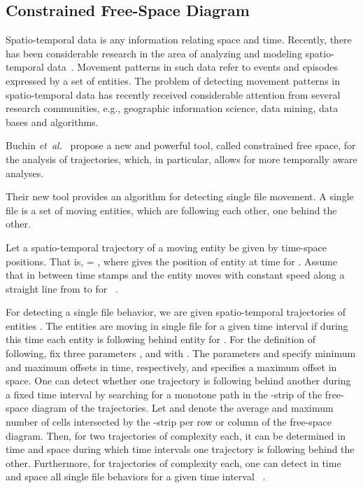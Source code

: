 \documentclass[12pt]{dalthesis}
\newcommand{\etal}{{\em et~al.\/}}
\begin{document}
\subsection{Constrained Free-Space Diagram}


Spatio-temporal data is any information relating space and time. 
Recently, there has been considerable research 
in the area of analyzing and modeling spatio-temporal data~\cite{Cons-Free}. 
Movement patterns in such data refer to 
events and episodes expressed by a set of entities.
The problem of detecting movement patterns in spatio-temporal data has recently received considerable 
attention from several research communities, e.g., geographic information science, data mining, data bases and algorithms.

Buchin \etal~\cite{Cons-Free} propose a new and powerful tool, called constrained free space, 
for the analysis of trajectories, which, in  particular, allows for more temporally aware analyses. 

Their new tool provides an algorithm for detecting single file movement. 
A single file is a set of moving entities, which 
are following each other, one behind the other. 

Let a spatio-temporal trajectory  of a moving entity  be
given by  time-space positions. That is,  = , 
where  gives the position of entity  
at time  for .
Assume that in between time stamps  and  the
entity  moves with constant speed along a straight line
from  to  for  ~\cite{Cons-Free}. 

For detecting a single file behavior, we are given  spatio-temporal trajectories
 of entities .
The entities  are moving in single
file for a given time interval if during this time each entity
 is following behind entity  for .
For the definition of following, fix three parameters
, and  with . The parameters
 and  specify minimum and maximum offsets in time, 
respectively, 
and  specifies a maximum offset in space. 
One can detect whether one trajectory
is following behind another during a fixed time interval by
searching for a monotone path in the -strip of
the free-space diagram of the trajectories. Let 
and  denote the average and maximum number of
cells intersected by the -strip per row or column
of the free-space diagram. Then, for two trajectories of 
complexity  each, it can be determined in  time 
and  space during which time intervals one 
trajectory is following behind the other. 
Furthermore, for  trajectories of complexity  each, one can detect in  
time and  space all single file behaviors for a given time interval~\cite{Cons-Free} .
\end{document}
